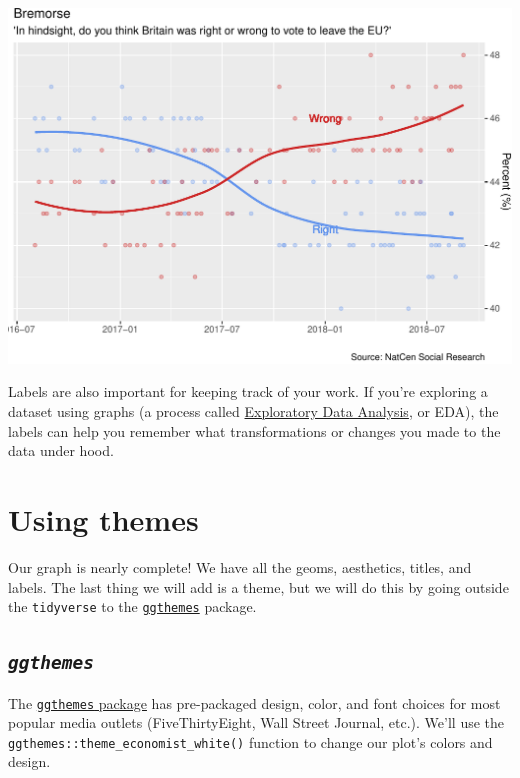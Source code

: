 \documentclass[letterpaper,12pt,twoside,]{pinp}
\begin{document}
\begin{center}\includegraphics{03-intro-to-ggplot2_files/figure-latex/ggp_brexit_labs-1} \end{center}

Labels are also important for keeping track of your work. If you're
exploring a dataset using graphs (a process called
\href{https://en.wikipedia.org/wiki/Exploratory_data_analysis}{Exploratory
Data Analysis}, or EDA), the labels can help you remember what
transformations or changes you made to the data under hood.

\hypertarget{using-themes}{%
\section{Using themes}\label{using-themes}}

Our graph is nearly complete! We have all the geoms, aesthetics, titles,
and labels. The last thing we will add is a theme, but we will do this
by going outside the \texttt{tidyverse} to the
\href{https://yutannihilation.github.io/allYourFigureAreBelongToUs/ggthemes/}{\texttt{ggthemes}}
package.

\hypertarget{ggthemes}{%
\subsection{\texorpdfstring{\textbf{\emph{\texttt{ggthemes}}}}{ggthemes}}\label{ggthemes}}

The
\href{https://yutannihilation.github.io/allYourFigureAreBelongToUs/ggthemes/}{\texttt{ggthemes}
package} has pre-packaged design, color, and font choices for most
popular media outlets (FiveThirtyEight, Wall Street Journal, etc.).
We'll use the \texttt{ggthemes::theme\_economist\_white()} function to
change our plot's colors and design.
\end{document}

